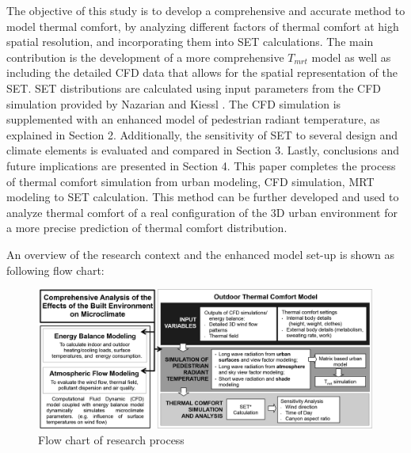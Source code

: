 \documentclass[preprint,3p,12pt,english]{elsarticle}
\begin{document}
The objective of this study is to develop a comprehensive and accurate method to model thermal comfort, by analyzing different factors of thermal comfort at high spatial resolution, and incorporating them into SET calculations. The main contribution is the development of a more comprehensive $T_{mrt}$ model as well as including the detailed CFD data that allows for the spatial representation of the SET. SET distributions are calculated using input parameters from the CFD simulation provided by Nazarian and Kiessl \cite{nazarian2014effects, nazarian2015cfd}. The CFD simulation is supplemented with an enhanced model of pedestrian radiant temperature, as explained in Section 2.  Additionally, the sensitivity of SET to several design and climate elements is evaluated and compared in Section 3. Lastly, conclusions and future implications are presented in Section 4. This paper completes the process of thermal comfort simulation from urban modeling, CFD simulation, MRT modeling to SET calculation. This method can be further developed and used to analyze thermal comfort of a real configuration of the 3D urban environment for a more precise prediction of thermal comfort distribution.

An overview of the research context and the enhanced model set-up is shown as following flow chart:
\begin{figure}[H]
\graphicspath{ {image/} }
\centerline{\includegraphics[width=16cm]{flowchartBW.PNG}}
\caption{Flow chart of research process}
\label{Fig.Visibility}
\end{figure}






%
%
%
%
%
%
%
%
\end{document}
